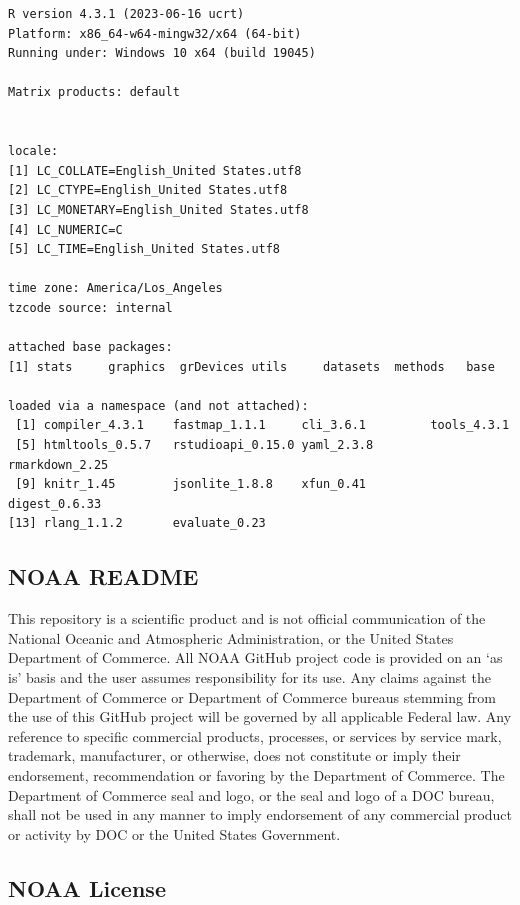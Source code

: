 \documentclass[
  letterpaper,
  oneside,
  open=any]{scrbook}
\begin{document}
\begin{verbatim}
R version 4.3.1 (2023-06-16 ucrt)
Platform: x86_64-w64-mingw32/x64 (64-bit)
Running under: Windows 10 x64 (build 19045)

Matrix products: default


locale:
[1] LC_COLLATE=English_United States.utf8 
[2] LC_CTYPE=English_United States.utf8   
[3] LC_MONETARY=English_United States.utf8
[4] LC_NUMERIC=C                          
[5] LC_TIME=English_United States.utf8    

time zone: America/Los_Angeles
tzcode source: internal

attached base packages:
[1] stats     graphics  grDevices utils     datasets  methods   base     

loaded via a namespace (and not attached):
 [1] compiler_4.3.1    fastmap_1.1.1     cli_3.6.1         tools_4.3.1      
 [5] htmltools_0.5.7   rstudioapi_0.15.0 yaml_2.3.8        rmarkdown_2.25   
 [9] knitr_1.45        jsonlite_1.8.8    xfun_0.41         digest_0.6.33    
[13] rlang_1.1.2       evaluate_0.23    
\end{verbatim}

\hypertarget{noaa-readme-1}{%
\subsection{NOAA README}\label{noaa-readme-1}}

This repository is a scientific product and is not official
communication of the National Oceanic and Atmospheric Administration, or
the United States Department of Commerce. All NOAA GitHub project code
is provided on an `as is' basis and the user assumes responsibility for
its use. Any claims against the Department of Commerce or Department of
Commerce bureaus stemming from the use of this GitHub project will be
governed by all applicable Federal law. Any reference to specific
commercial products, processes, or services by service mark, trademark,
manufacturer, or otherwise, does not constitute or imply their
endorsement, recommendation or favoring by the Department of Commerce.
The Department of Commerce seal and logo, or the seal and logo of a DOC
bureau, shall not be used in any manner to imply endorsement of any
commercial product or activity by DOC or the United States Government.

\hypertarget{noaa-license-1}{%
\subsection{NOAA License}\label{noaa-license-1}}
\end{document}
